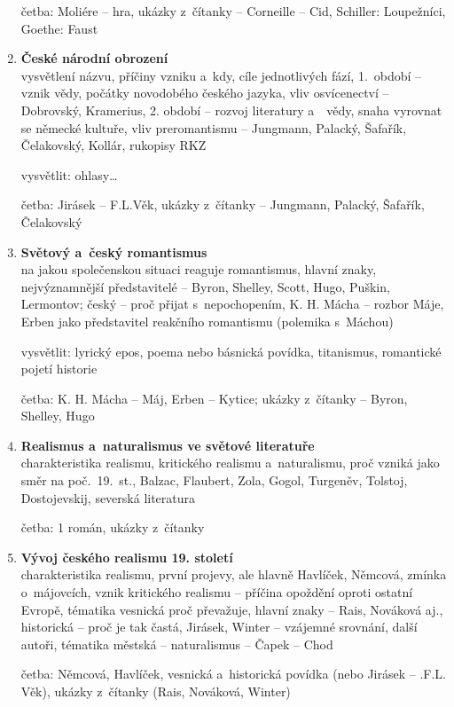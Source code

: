 \begin{enumerate}
četba: Moliére -- hra, ukázky z~čítanky -- Corneille -- Cid, Schiller:
Loupežníci, Goethe: Faust

\item \textbf{České národní obrození} \\
vysvětlení názvu, příčiny vzniku a~kdy, cíle jednotlivých fází, 
1.~období -- vznik vědy, počátky novodobého českého jazyka, vliv 
osvícenectví -- Dobrovský, Kramerius, 2. období -- rozvoj literatury
a~~vědy, snaha vyrovnat se německé kultuře, vliv preromantismu -- 
Jungmann, Palacký, Šafařík, Čelakovský, Kollár, rukopisy RKZ

vysvětlit: ohlasy\dots

četba: Jirásek -- F.L.Věk, ukázky z~čítanky -- Jungmann, Palacký, 
Šafařík, Čelakovský
   
\item \textbf{Světový a~český romantismus} \\
na jakou společenskou situaci reaguje romantismus, hlavní znaky, 
nejvýznamnější představitelé -- Byron, Shelley, Scott, Hugo, Puškin, 
Lermontov; český -- proč přijat s~nepochopením, K. H. Mácha -- rozbor Máje, 
Erben jako představitel reakčního romantismu (polemika s~Máchou)

vysvětlit: lyrický epos, poema nebo básnická povídka, titanismus, 
romantické pojetí historie

četba: K. H. Mácha -- Máj, Erben -- Kytice; ukázky z~čítanky -- Byron, 
Shelley, Hugo

\item \textbf{Realismus a~naturalismus ve světové literatuře} \\
charakteristika realismu, kritického realismu a~naturalismu, proč
vzniká jako směr na poč.~19.~st., Balzac, Flaubert, Zola, Gogol, 
Turgeněv, Tolstoj, Dostojevskij, severská literatura

četba: 1 román, ukázky z~čítanky
     
\item \textbf{Vývoj českého realismu 19. století} \\
charakteristika realismu, první projevy, ale hlavně Havlíček, Němcová, 
zmínka o~májovcích, vznik kritického realismu -- příčina opoždění oproti
ostatní Evropě, tématika vesnická proč převažuje, hlavní znaky -- Rais, 
Nováková aj., historická -- proč je tak častá, Jirásek, Winter --
vzájemné srovnání, další autoři, tématika  městská -- naturalismus --
Čapek -- Chod

četba: Němcová, Havlíček, vesnická a~historická povídka (nebo Jirásek --
.F.L. Věk), ukázky z~čítanky (Rais, Nováková, Winter)
     

\end{enumerate}
